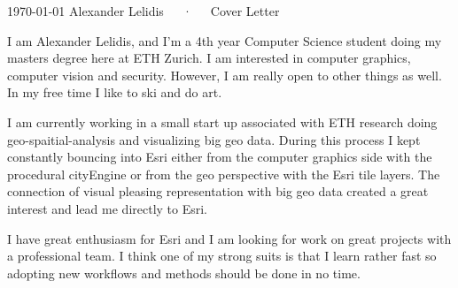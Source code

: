 \documentclass[11pt, a4paper]{awesome-cv}
\begin{document}
\makecvheader[R]

\makecvfooter
  {\today}
  {Alexander Lelidis~~~·~~~Cover Letter}
  {}

\makelettertitle

\begin{cvletter}

I am Alexander Lelidis, and I’m a 4th year Computer Science student doing my masters degree here at ETH Zurich. I am interested in computer graphics, computer vision and security. However, I am really open to other things as well. In my free time I like to ski and do art.

I am currently working in a small start up associated with ETH research doing geo-spaitial-analysis and visualizing big geo data. During this process I kept constantly bouncing into Esri either from the computer graphics side with the procedural cityEngine or from the geo perspective with the Esri tile layers. The connection of visual pleasing representation with big geo data created a great interest and lead me directly to Esri. 

I have great enthusiasm for Esri and I am looking for work on great projects with a professional team. I think one of my strong suits is that I learn rather fast so adopting new workflows and methods should be done in no time.


\end{cvletter}


\makeletterclosing
\end{document}
